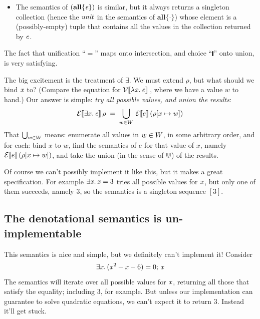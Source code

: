 \begin{itemize}
  collection of values returned by \ensuremath{\Varid{e}}.  If \ensuremath{\Varid{e}} returns no values, so does \ensuremath{(\textbf{one}\{\Varid{e}\})}; but if \ensuremath{\Varid{e}} returns one or more values,
  \ensuremath{(\textbf{one}\{\Varid{e}\})} returns the first.  Of course that begs the question of what ``the first'' means -- for bags
  it would be non-deterministic. We will fix this problem in , but for now we simply ignore it.
\item The semantics of \ensuremath{(\textbf{all}\{\Varid{e}\})} is similar, but it always returns a singleton collection
  (hence the $\mathit{unit}$ in the semantics of \ensuremath{\textbf{all}\{\cdot \}}) whose
  element is a (possibly-empty) tuple that contains all the values in the collection returned by \ensuremath{\Varid{e}}.
\end{itemize}
The fact that unification ``\ensuremath{\mathrel{=}}'' maps onto intersection, and choice ``\ensuremath{\rule[-0.3mm]{0.5mm}{2.5mm}}'' onto union, is
very satisfying.

The big excitement is the treatment of \ensuremath{\exists}. We must extend $\rho$, but what should we bind \ensuremath{\Varid{x}} to?  (Compare the
equation for $\mathcal{V}\llbracket \lambda\mathit{x}.\,\mathit{e} \rrbracket\,$, where we have a value $w$ to hand.)
Our answer is simple: \emph{try all possible values, and union the results}:
$$
\mathcal{E}\llbracket \exists\mathit{x}.\,\mathit{e} \rrbracket\, \rho \; = \; \bigcup_{w \in W}\, \mathcal{E}\llbracket e \rrbracket\, (\rho[x \mapsto w])
$$
That $\bigcup_{w \in W}$ means: enumerate all values in $w \in W$, in some arbitrary order,
and for each: bind $x$ to $w$, find the semantics of $e$ for that value of $x$, namely
$\mathcal{E}\llbracket e \rrbracket\, (\rho[x \mapsto w])$, and take the union
(in the sense of $\Cup$) of the results.

Of course we can't possibly implement it like this, but it makes a great specification.
For example \ensuremath{\exists\Varid{x}.\,\Varid{x}\mathrel{=}\mathrm{3}} tries all possible values for \ensuremath{\Varid{x}}, but only one of them succeeds, namely \ensuremath{\mathrm{3}}, so
the semantics is a singleton sequence $[3]$.

\subsection{The denotational semantics is un-implementable}

This semantics is nice and simple, but we definitely can't implement it!  Consider
$$
\exists\mathit{x}.\,(\mathit{x}^2\mathbin{-}\mathit{x}\mathbin{-}\mathrm{6})\mathrel{=}\mathrm{0};\,\mathit{x}
$$
The semantics will iterate over all possible values for \ensuremath{\Varid{x}}, returning all those that satisfy the equality;
including $3$, for example. But unless our implementation can guarantee to solve quadratic equations,
we can't expect it to return 3.  Instead it'll get stuck.

